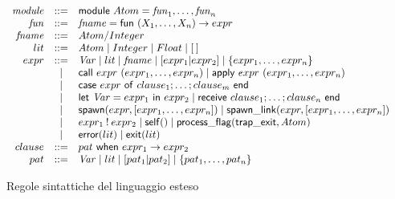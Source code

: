 \documentclass[Contributo.tex]{subfiles}
\begin{document}
\begin{figure}[!ht]
  $\displaystyle
  \begin{array}{rcl@{~~~~~~}l}
    \mathit{module} & ::= & \mathsf{module} ~ Atom = %
    \mathit{fun}_1,\ldots,\mathit{fun}_n\\
    {\mathit{fun}} & ::= & \mathit{fname} = \mathsf{fun}~(X_1,\ldots,X_n) \to expr \\
    {\mathit{fname}} & ::= & Atom/Integer \\
    lit & ::= & Atom \mid Integer \mid Float \mid \nil \\
    expr & ::= & \mathit{Var} \mid lit \mid \mathit{fname} \mid [expr_1|expr_2]
                 \mid   \{expr_1,\ldots,expr_n\} \\
    & \mid & \mathsf{call}~expr~(expr_1,\ldots,expr_n) 
    \mid \mathsf{apply}~expr~(expr_1,\ldots,expr_n) \\
    & \mid &
    \mathsf{case}~expr~\mathsf{of}~clause_1;\ldots;clause_m~\mathsf{end}\\
    & \mid & \mathsf{let}~\mathit{Var}=expr_1~\mathsf{in}~expr_2 
    \mid \mathsf{receive}~clause_1;\ldots;clause_n~\mathsf{end}\\
    & \mid & \mathsf{spawn}(expr,[expr_1,\ldots,expr_n])  \mid \mathsf{spawn\_link}(expr,[expr_1,\ldots,expr_n])\\
    & \mid & expr_1 \:!\: expr_2 \mid \mathsf{self}() \mid \mathsf{process\_flag}(\mathsf{trap\_exit},Atom)\\
    & \mid & \mathsf{error}(lit) \mid \mathsf{exit}(lit)\\
     clause & ::= & pat ~\mathsf{when}~expr_1 \to expr_2
    \\
    pat & ::= & \mathit{Var} \mid lit \mid [pat_1|pat_2] \mid
    \{pat_1,\ldots,pat_n\} \\
  \end{array}
  $
\caption{Regole sintattiche del linguaggio esteso} 
\label{newrules}
\end{figure}
\end{document}
